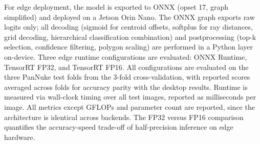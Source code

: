 For edge deployment, the model is exported to ONNX (opset 17, graph simplified) and deployed on a Jetson Orin Nano. The ONNX graph exports raw logits only; all decoding (sigmoid for centroid offsets, softplus for ray distances, grid decoding, hierarchical classification combination) and postprocessing (top-k selection, confidence filtering, polygon scaling) are performed in a Python layer on-device. Three edge runtime configurations are evaluated: ONNX Runtime, TensorRT FP32, and TensorRT FP16. All configurations are evaluated on the three PanNuke test folds from the 3-fold cross-validation, with reported scores averaged across folds for accuracy parity with the desktop results. Runtime is measured via wall-clock timing over all test images, reported as milliseconds per image. All metrics except GFLOPs and parameter count are reported, since the architecture is identical across backends. The FP32 versus FP16 comparison quantifies the accuracy-speed trade-off of half-precision inference on edge hardware.

